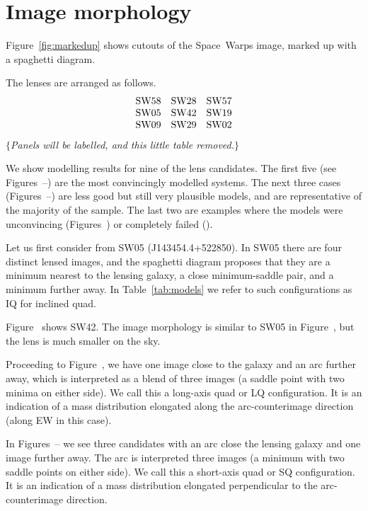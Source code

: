\section{Image morphology}

Figure~\ref{fig:markedup} shows cutouts of the Space~Warps image,
marked up with a spaghetti diagram.

The lenses are arranged as follows.
$$
\begin{matrix}
\rm SW58 & \rm SW28 & \rm SW57 \\
\rm SW05 & \rm SW42 & \rm SW19 \\
\rm SW09 & \rm SW29 & \rm SW02
\end{matrix}
$$ 
$\{${\em Panels will be labelled, and this little table removed.}$\}$

We show modelling results for nine of the lens candidates.  The first
five (see Figures~--) are the most
convincingly modelled systems.  The next three cases
(Figures~--) are less good but still very
plausible models, and are representative of the majority of the
sample.  The last two are examples where the models were unconvincing
(Figures~) or completely failed ().


Let us first consider from SW05 (J143454.4+522850).
In SW05 there are four distinct lensed images, and the spaghetti
diagram proposes that they are a minimum nearest to the lensing
galaxy, a close minimum-saddle pair, and a minimum further away. In
Table~\ref{tab:models} we refer to such configurations as IQ for
inclined quad.

Figure~ shows SW42.  The image morphology is similar to
SW05 in Figure~, but the lens is much smaller on the sky.

Proceeding to Figure~, we have one image close to the
galaxy and an arc further away, which is interpreted as a blend of
three images (a saddle point with two minima on either side).  We call
this a long-axis quad or LQ configuration.  It is an indication of a
mass distribution elongated along the arc-counterimage direction
(along EW in this case).

In Figures~-- we see three candidates with
an arc close the lensing galaxy and one image further away.  The arc
is interpreted three images (a minimum with two saddle points on
either side).  We call this a short-axis quad or SQ configuration.  It
is an indication of a mass distribution elongated perpendicular to the
arc-counterimage direction.

\begin{figure*}
\caption{Marked-up images. \label{fig:markedup}}
\end{figure*}

